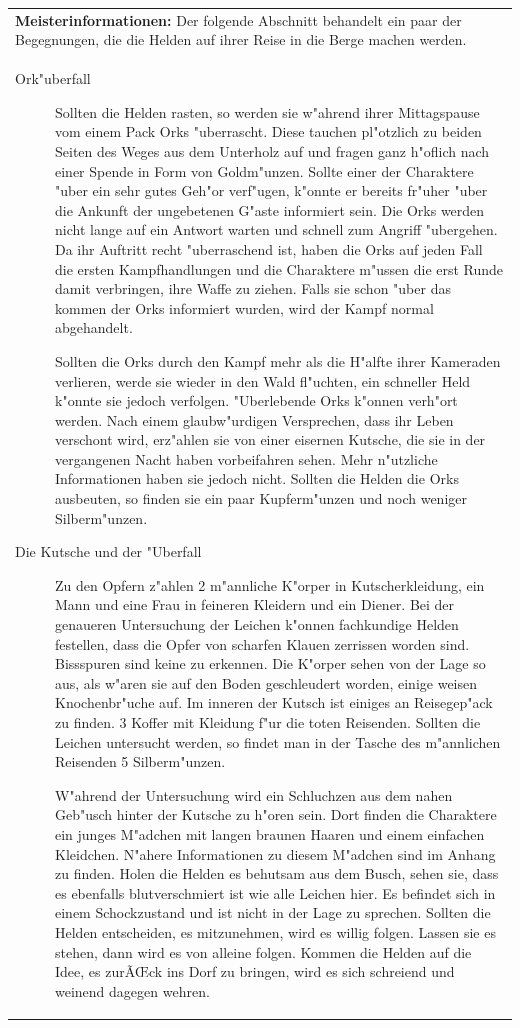 \begin{longtable}{|p{15cm}|}
\hline
\textbf{Meisterinformationen:}
Der folgende Abschnitt behandelt ein paar der Begegnungen, die die Helden auf ihrer Reise in die Berge machen werden.\\
\begin{description}
\item [Ork"uberfall] Sollten die Helden rasten, so werden sie w"ahrend ihrer Mittagspause vom einem Pack Orks "uberrascht. Diese tauchen pl"otzlich zu beiden Seiten des Weges aus dem Unterholz auf und fragen ganz h"oflich nach einer Spende in Form von Goldm"unzen. Sollte einer der Charaktere "uber ein sehr gutes Geh"or verf"ugen, k"onnte er bereits fr"uher "uber die Ankunft der ungebetenen G"aste informiert sein. Die Orks werden nicht lange auf ein Antwort warten und schnell zum Angriff "ubergehen. Da ihr Auftritt recht "uberraschend ist, haben die Orks auf jeden Fall die ersten Kampfhandlungen und die Charaktere m"ussen die erst Runde damit verbringen, ihre Waffe zu ziehen. Falls sie schon "uber das kommen der Orks informiert wurden, wird der Kampf normal abgehandelt.
\par Sollten die Orks durch den Kampf mehr als die H"alfte ihrer Kameraden verlieren, werde sie wieder in den Wald fl"uchten, ein schneller Held k"onnte sie jedoch verfolgen. "Uberlebende Orks k"onnen verh"ort werden. Nach einem glaubw"urdigen Versprechen, dass ihr Leben verschont wird, erz"ahlen sie von einer eisernen Kutsche, die sie in der vergangenen Nacht haben vorbeifahren sehen. Mehr n"utzliche Informationen haben sie jedoch nicht. Sollten die Helden die Orks ausbeuten, so finden sie ein paar Kupferm"unzen und noch weniger Silberm"unzen.
\end{description}
\begin{description}
\item [Die Kutsche und der "Uberfall] Zu den Opfern z"ahlen 2 m"annliche K"orper in Kutscherkleidung, ein Mann und eine Frau in feineren Kleidern und ein Diener. Bei der genaueren Untersuchung der Leichen k"onnen fachkundige Helden festellen, dass die Opfer von scharfen Klauen zerrissen worden sind. Bissspuren sind keine zu erkennen. Die K"orper sehen von der Lage so aus, als w"aren sie auf den Boden geschleudert worden, einige weisen Knochenbr"uche auf. Im inneren der Kutsch ist einiges an Reisegep"ack zu finden. 3 Koffer mit Kleidung f"ur die toten Reisenden. Sollten die Leichen untersucht werden, so findet man in der Tasche des m"annlichen Reisenden 5 Silberm"unzen.
\par W"ahrend der Untersuchung wird ein Schluchzen aus dem nahen Geb"usch hinter der Kutsche zu h"oren sein. Dort finden die Charaktere ein junges M"adchen mit langen braunen Haaren und einem einfachen Kleidchen. N"ahere Informationen zu diesem M"adchen sind im Anhang zu finden. Holen die Helden es behutsam aus dem Busch, sehen sie, dass es ebenfalls blutverschmiert ist wie alle Leichen hier. Es befindet sich in einem Schockzustand und ist nicht in der Lage zu sprechen. Sollten die Helden entscheiden, es mitzunehmen, wird es willig folgen. Lassen sie es stehen, dann wird es von alleine folgen. Kommen die Helden auf die Idee, es zurÃŒck ins Dorf zu bringen, wird es sich schreiend und weinend dagegen wehren.

\end{description}
\end{longtable}

